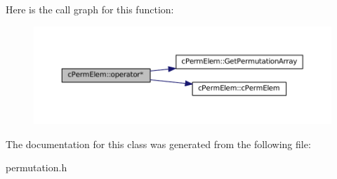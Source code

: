 \-Here is the call graph for this function\-:\nopagebreak
\begin{figure}[H]
\begin{center}
\leavevmode
\includegraphics[width=350pt]{classcPermElem_a19da6e521f8adf3d252250f3836c563e_cgraph}
\end{center}
\end{figure}




\-The documentation for this class was generated from the following file\-:\begin{DoxyCompactItemize}
\item 
permutation.\-h\end{DoxyCompactItemize}
